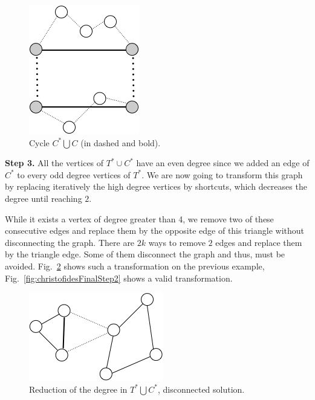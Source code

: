 {\begin{figure}[hbt]
\begin{center}
       \includegraphics[scale=0.7]{FiguresGraph/perfectmatching3}
       \caption{Cycle $C^* \bigcup C$ (in dashed and bold).}
              \label{fig:perfectMatchingC}
\end{center}
\end{figure}

\bigskip

\textbf{Step 3.} 
All the vertices of $T^* \cup C^*$ have an even degree since we added an edge of $C^*$ to every odd degree vertices of $T^*$. 
We are now going to transform this graph by replacing iteratively the high degree vertices by shortcuts, which decreases the degree until reaching $2$. 

While it exists a vertex of degree greater than 4, we remove two of these consecutive edges and replace them by the opposite edge of this triangle 
without disconnecting the graph. There are $2k$ ways to remove $2$ edges and replace them by the triangle edge. Some of them disconnect the graph
and thus, must be avoided. 
Fig.~\ref{fig:christofidesFinalStep1} shows such a transformation on the previous example, 
Fig.~\ref{fig:christofidesFinalStep2} shows a valid transformation.

\begin{figure}[hbt]
\begin{center}
       \includegraphics[scale=0.6]{FiguresGraph/christofides4}
       \caption{Reduction of the degree in $T^* \bigcup C^*$, disconnected solution.}
              \label{fig:christofidesFinalStep1}
\end{center}
\end{figure}

}
